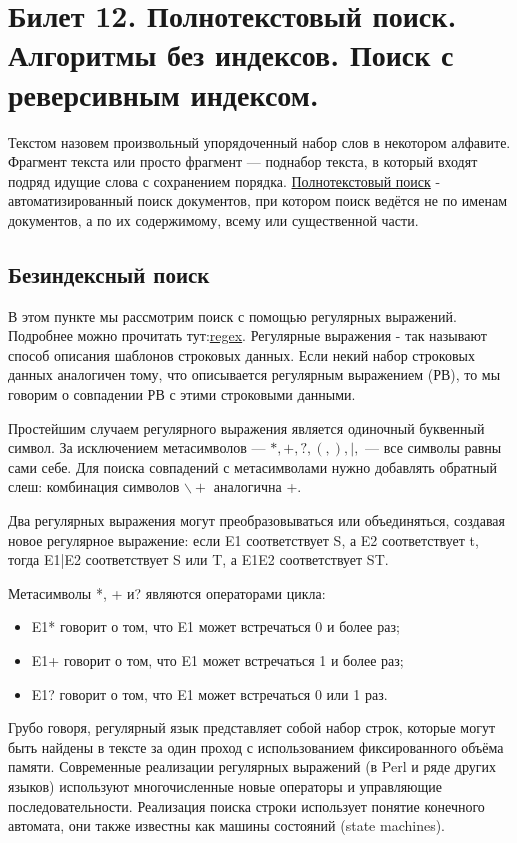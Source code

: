 \newpage
\section {Билет 12. Полнотекстовый поиск. Алгоритмы без индексов. Поиск с реверсивным индексом.}

Текстом назовем произвольный упорядоченный набор слов в некотором алфавите. Фрагмент текста или просто фрагмент — поднабор текста, в который входят подряд идущие слова с сохранением порядка.
\href{https://clck.ru/pwwdR}{Полнотекстовый поиск} - автоматизированный поиск документов, при котором поиск ведётся не по именам документов, а по их содержимому, всему или существенной части.

\subsection{Безиндексный поиск}
В этом пункте мы рассмотрим поиск с помощью регулярных выражений. Подробнее можно прочитать тут:\href{https://habr.com/ru/company/vk/blog/270507/}{regex}. Регулярные выражения - так называют способ описания шаблонов строковых данных. Если некий набор строковых данных аналогичен тому, что описывается регулярным выражением (РВ), то мы говорим о совпадении РВ с этими строковыми данными.

Простейшим случаем регулярного выражения является одиночный буквенный символ. За исключением метасимволов — $*, +, ?, (, ),|,$ — все символы равны сами себе. Для поиска совпадений с метасимволами нужно добавлять обратный слеш: комбинация символов $\backslash +$ аналогична +.

Два регулярных выражения могут преобразовываться или объединяться, создавая новое регулярное выражение: если E1 соответствует S, а E2 соответствует t, тогда E1|E2 соответствует S или T, а E1E2 соответствует ST.

Метасимволы *, + и? являются операторами цикла:
\begin {itemize}
\item E1* говорит о том, что E1 может встречаться 0 и более раз;
\item E1+ говорит о том, что E1 может встречаться 1 и более раз;
\item E1? говорит о том, что E1 может встречаться 0 или 1 раз.
\end {itemize}

Грубо говоря, регулярный язык представляет собой набор строк, которые могут быть найдены в тексте за один проход с использованием фиксированного объёма памяти. Современные реализации регулярных выражений (в Perl и ряде других языков) используют многочисленные новые операторы и управляющие последовательности. Реализация поиска строки использует понятие конечного автомата, они также известны как машины состояний (state machines). 

